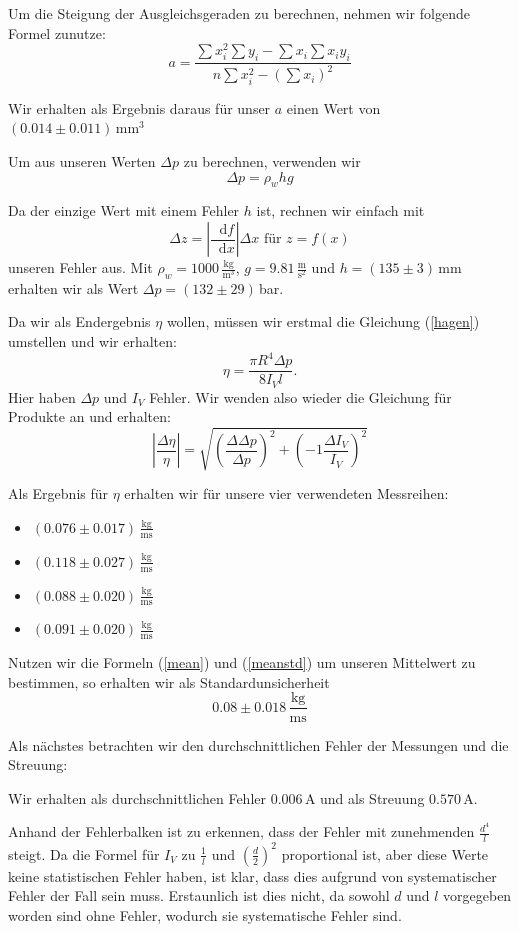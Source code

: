 \documentclass[11pt,a4paper]{article}
\newcommand\dif{\mathop{}\!\mathrm{d}}
\begin{document}
Um die Steigung der Ausgleichsgeraden zu berechnen, nehmen wir folgende Formel zunutze:
$$
a=\frac{\sum x_i^2\sum y_i-\sum x_i\sum x_iy_i}{n\sum x_i^2-(\sum x_i)^2}
$$

Wir erhalten als Ergebnis daraus f\"ur unser $a$ einen Wert von $(0.014\pm0.011)\,\mathrm{mm}^3$

Um aus unseren Werten $\Delta p$ zu berechnen, verwenden wir
$$
\Delta p=\rho_w hg
$$

Da der einzige Wert mit einem Fehler $h$ ist, rechnen wir einfach mit
$$
\Delta z=\left|\frac{\dif f}{\dif x}\right|\Delta x\textrm{ f\"ur }z=f(x)
$$
unseren Fehler aus.
Mit $\rho_w=1000\,\frac{\mathrm{kg}}{\mathrm{m}^3}$, $g=9.81\,\frac{\mathrm{m}}{\mathrm{s}^2}$ und $h=(135\pm3)\,\mathrm{mm}$ erhalten wir als Wert $\Delta p=(132\pm29)\,$bar.

Da wir als Endergebnis $\eta$ wollen, m\"ussen wir erstmal die Gleichung (\ref{hagen}) umstellen und wir erhalten:
$$
\eta=\frac{\pi R^4\Delta p}{8I_V l}.
$$
Hier haben $\Delta p$ und $I_V$ Fehler. Wir wenden also wieder die Gleichung f\"ur Produkte an und erhalten:
$$
\left\vert\frac{\Delta\eta}{\eta}\right\vert=\sqrt{\left(\frac{\Delta\Delta p}{\Delta p}\right)^2+\left(-1\frac{\Delta I_V}{I_V}\right)^2}
$$

Als Ergebnis f\"ur $\eta$ erhalten wir f\"ur unsere vier verwendeten Messreihen:
\begin{itemize}
\item $(0.076\pm0.017)\,\mathrm{\frac{kg}{ms}}$
\item $(0.118\pm0.027)\,\mathrm{\frac{kg}{ms}}$
\item $(0.088\pm0.020)\,\mathrm{\frac{kg}{ms}}$
\item $(0.091\pm0.020)\,\mathrm{\frac{kg}{ms}}$
\end{itemize}


Nutzen wir die Formeln (\ref{mean}) und (\ref{meanstd}) um unseren Mittelwert zu bestimmen, so erhalten wir als Standardunsicherheit
\[
0.08\pm0.018\,\mathrm{\frac{kg}{ms}}
\]

Als n\"achstes betrachten wir den durchschnittlichen Fehler der Messungen und die Streuung:

Wir erhalten als durchschnittlichen Fehler $0.006\,$A und als Streuung $0.570\,$A.

Anhand der Fehlerbalken ist zu erkennen, dass der Fehler mit zunehmenden $\frac{d^4}{l}$ steigt. Da die Formel f\"ur $I_V$ zu  $\frac{1}{l}$ und $\left(\frac{d}{2}\right)^2$ proportional ist, aber diese Werte keine statistischen Fehler haben, ist klar, dass dies aufgrund von systematischer Fehler der Fall sein muss. Erstaunlich ist dies nicht, da sowohl $d$ und $l$ vorgegeben worden sind ohne Fehler, wodurch sie systematische Fehler sind.
\end{document}
